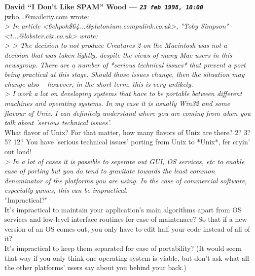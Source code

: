 \documentclass[11pt,twoside,a4paper]{article}
\begin{document}
\begin{multicols*}{2}
 
		
	
		
\textbf{David ``I Don't Like SPAM'' Wood --- \emph{\texttt{23 feb 1998, 10:00}}}~\\

jwbo...@mailcity.com wrote:~\\

\emph{> In article <6chpoh\$64...@plutonium.compulink.co.uk>, "Toby Simpson" <t...@lobster.cix.co.uk> wrote:}~\\
\emph{> > The decision to not produce Creatures 2 on the Macintosh was not a decision that was taken lightly, despite the views of many Mac users in this newsgroup. There are a number of *serious technical issues* that prevent a port being practical at this stage. Should those issues change, then the situation may change also -- however, in the short term, this is very unlikely.}~\\

\emph{> I work a lot on developing systems that have to be portable between different machines and operating systems. In my case it is usually Win32 and some flavour of Unix. I can definitely understand where you are coming from when you talk about 'serious technical issues'.}~\\

What flavor of Unix? For that matter, how many flavors of Unix are there? 2? 3? 5? 12? You have 'serious technical issues' porting from Unix to *Unix*, fer cryin' out loud!~\\

\emph{> In a lot of cases it is possible to seperate out GUI, OS services, etc to enable ease of porting but you do tend to gravitate towards the least common denominator of the platforms you are using. In the case of commercial software, especially games, this can be impractical.}~\\

"Impractical?"~\\

It's impractical to maintain your application's main algorithms apart from OS services and low-level interface routines for ease of maintenace? So that if a new version of an OS comes out, you only have to edit half your code instead of all of it?~\\

It's impractical to keep them separated for ease of portability? (It would seem that way if you only think one operating system is viable, but don't ask what all the other platforms' users say about you behind your back.)~\\


\end{multicols*}
\end{document}
